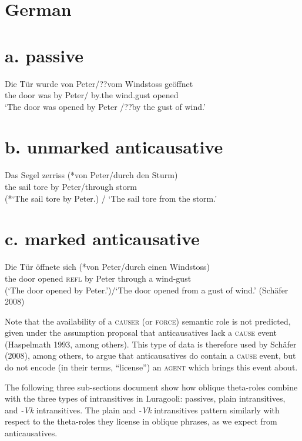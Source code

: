 \documentclass[output=paper]{langsci/langscibook}
\begin{document}
\begin{styleTabellenberschrift}
\chapter[  German]{  German}
\chapter[a. passive]{a. \textbf{passive}}
\gll   Die Tür wurde von Peter/??vom      Windstoss  geöffnet\\
       the door was    by   Peter/     by.the  wind.gust   opened\\
\glt ‘The door was opened by Peter /??by the gust of wind.’
\z

\chapter[b. unmarked anticausative]{b. \textbf{unmarked anticausative}}
\gll   Das Segel zerriss (*von Peter/durch den Sturm)\\
       the  sail    tore        by    Peter/through storm\\
\glt (*‘The sail tore by Peter.) / ‘The sail tore from the storm.’ 
\z

\chapter[c. marked anticausative]{c. \textbf{marked anticausative}}
\gll   Die Tür   öffnete sich (*von Peter/durch einen Windstoss)\\
       the door opened \textsc{refl}  by   Peter  through a wind-gust\\
\glt (‘The door opened by Peter.’)/‘The door opened from a gust of wind.’      (Schäfer 2008)
\z

Note that the availability of a \textsc{causer} (or \textsc{force}) semantic role is not predicted, given under the assumption proposal that anticausatives lack a\textsc{ cause }event (Haspelmath 1993, among others). This type of data is therefore used by Schäfer (2008), among others, to argue that anticausatives do contain a \textsc{cause} event, but do not encode (in their terms, “license”) an \textsc{agent} which brings this event about. 

The following three sub-sections document show how oblique theta-roles combine with the three types of intransitives in Luragooli: passives, plain intransitives, and \textit{{}-Vk} intransitives. The plain and \textit{{}-Vk} intransitives pattern similarly with respect to the theta-roles they license in oblique phrases, as we expect from anticausatives.


\end{styleTabellenberschrift}
\end{document}
